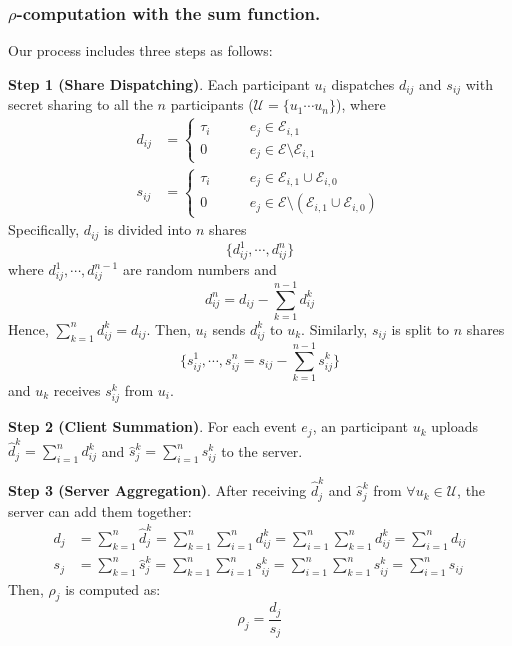 \subsubsection{$\rho$-computation with the sum function.} Our process includes three steps as follows:


\textbf{Step 1 (Share Dispatching)}. Each participant $u_i$ dispatches $d_{ij}$ and $s_{ij}$ with secret sharing to all the $n$ participants ($\mathcal U = \{u_1\cdots u_n\}$), where
\begin{align}
	d_{ij} & = 
	\begin{cases}
		\tau_i & \quad\quad e_j \in \mathcal E_{i,1} \\
		0 & \quad\quad e_j \in \mathcal E\setminus \mathcal E_{i,1}
	\end{cases}\\
	s_{ij} &= 
	\begin{cases}
		\tau_i & \quad\quad e_j \in \mathcal E_{i,1}\cup \mathcal E_{i,0} \\
		0 & \quad\quad e_j \in \mathcal E\setminus(\mathcal E_{i,1}\cup \mathcal E_{i,0})
	\end{cases}
\end{align}
Specifically, $d_{ij}$ is divided into $n$ shares
$$\{d_{ij}^1,\cdots,d_{ij}^n\}$$ 
where $d_{ij}^1, \cdots, d_{ij}^{n-1}$ are random numbers and 
$$d_{ij}^n = d_{ij} - \sum_{k=1}^{n-1} d_{ij}^k$$
Hence,
$\sum_{k=1}^n d_{ij}^k = d_{ij}$.
Then, $u_i$ sends $d_{ij}^k$ to $u_k$. Similarly, $s_{ij}$ is split to $n$ shares 
$$\{s_{ij}^1,\cdots,s_{ij}^n=s_{ij}-\sum_{k=1}^{n-1} s_{ij}^k\}$$
and $u_k$ receives $s_{ij}^k$ from $u_i$.

\textbf{Step 2 (Client Summation)}. For each event $e_j$, an participant $u_k$ uploads $\hat d_{j}^k=\sum_{i=1}^n d_{ij}^k$ and $\hat s_{j}^k = \sum_{i=1}^n s_{ij}^k$ to the server.

\textbf{Step 3 (Server Aggregation)}. After receiving $\hat d_{j}^k$ and $\hat s_{j}^k$ from $\forall u_k \in \mathcal U$, the server can add them together:
\begin{align}
	d_j & = \sum_{k=1}^n \hat d_{j}^k = \sum_{k=1}^n\sum_{i=1}^n d_{ij}^k = \sum_{i=1}^n \sum_{k=1}^n d_{ij}^k = \sum_{i=1}^n d_{ij} \\
	s_j & = \sum_{k=1}^n \hat s_{j}^k = \sum_{k=1}^n\sum_{i=1}^n s_{ij}^k = \sum_{i=1}^n \sum_{k=1}^n s_{ij}^k = \sum_{i=1}^n s_{ij}
\end{align}
Then, $\rho_j$ is computed as:
\begin{equation}
	\rho_j = \frac{d_j}{s_j}
\end{equation}


